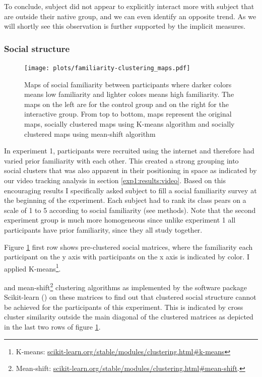 \documentclass[a4paper,11pt]{article}
\begin{document}
{To conclude, subject did not appear to explicitly interact more with subject that are outside their native group, and we can even identify an opposite trend.
As we will shortly see this observation is further supported by the implicit measures.

\subsubsection{Social structure}\label{results:social_structure}

\begin{figure}[!htb]
    \centering
    \texttt{[image: plots/familiarity-clustering\_maps.pdf]}
    \caption{Maps of social familiarity between participants where darker colors means low familiarity and lighter colors means high familiarity. The maps on the left are for the control group and on the right for the interactive group. From top to bottom, maps represent the original maps, socially clustered maps using K-means algorithm and socially clustered maps using mean-shift algorithm}\label{plot:familiarity-clustering_maps}
\end{figure}

In experiment 1, participants were recruited using the internet and therefore had varied prior familiarity with each other.
This created a strong grouping into social clusters that was also apparent in their positioning in space as indicated by our video tracking analysis in section \ref{exp1:results:video}.
Based on this encouraging results I specifically asked subject to fill a social familiarity survey at the beginning of the experiment.
Each subject had to rank its class pears on a scale of 1 to 5 according to social familiarity (see methods).
Note that the second experiment group is much more homogeneous since unlike experiment 1 all participants have prior familiarity, since they all study together.

Figure \ref{plot:familiarity-clustering_maps} first row shows pre-clustered social matrices, where the familiarity each participant on the y axis with participants on the x axis is indicated by color.
I applied K-means\footnote{K-means: \href{http://scikit-learn.org/stable/modules/clustering.html\#k-means}{scikit-learn.org/stable/modules/clustering.html\#k-means}}.} and mean-shift\footnote{Mean-shift: \href{http://scikit-learn.org/stable/modules/clustering.html\#mean-shift}{scikit-learn.org/stable/modules/clustering.html\#mean-shift}.} clustering algorithms as implemented by the software package Scikit-learn (\cite{scikit-learn}) on these matrices to find out that clustered social structure cannot be achieved for the participants of this experiment.
This is indicated by cross cluster similarity outside the main diagonal of the clustered matrices as depicted in the last two rows of figure \ref{plot:familiarity-clustering_maps}.
\end{document}
